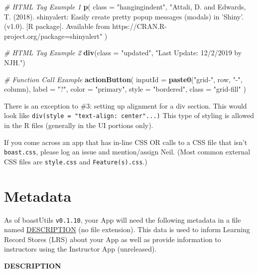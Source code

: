 \documentclass[
]{book}
\newenvironment{Shaded}{\begin{snugshade}}{\end{snugshade}}
\newcommand{\CommentTok}[1]{\textcolor[rgb]{0.56,0.35,0.01}{\textit{#1}}}
\newcommand{\DataTypeTok}[1]{\textcolor[rgb]{0.13,0.29,0.53}{#1}}
\newcommand{\KeywordTok}[1]{\textcolor[rgb]{0.13,0.29,0.53}{\textbf{#1}}}
\newcommand{\NormalTok}[1]{#1}
\newcommand{\StringTok}[1]{\textcolor[rgb]{0.31,0.60,0.02}{#1}}
\begin{document}
\begin{Shaded}
\begin{Highlighting}[]
\CommentTok{# HTML Tag Example 1}
\KeywordTok{p}\NormalTok{(}
  \DataTypeTok{class =} \StringTok{"hangingindent"}\NormalTok{,}
  \StringTok{"Attali, D. and Edwards, T. (2018). shinyalert: Easily create}
\StringTok{  pretty popup messages (modals) in 'Shiny'. (v1.0). [R package].}
\StringTok{  Available from https://CRAN.R-project.org/package=shinyalert"}
\NormalTok{)}

\CommentTok{# HTML Tag Example 2}
\KeywordTok{div}\NormalTok{(}\DataTypeTok{class =} \StringTok{"updated"}\NormalTok{, }\StringTok{"Last Update: 12/2/2019 by NJH."}\NormalTok{)}

\CommentTok{# Function Call Example}
\KeywordTok{actionButton}\NormalTok{(}
  \DataTypeTok{inputId =} \KeywordTok{paste0}\NormalTok{(}\StringTok{"grid-"}\NormalTok{, row, }\StringTok{"-"}\NormalTok{, column),}
  \DataTypeTok{label =} \StringTok{"?"}\NormalTok{,}
  \DataTypeTok{color =} \StringTok{"primary"}\NormalTok{,}
  \DataTypeTok{style =} \StringTok{"bordered"}\NormalTok{,}
  \DataTypeTok{class =} \StringTok{"grid-fill"}
\NormalTok{)}
\end{Highlighting}
\end{Shaded}

There is an exception to \#3: setting up alignment for a div section. This would look like \texttt{div(style\ =\ "text-align:\ center"...)} This type of styling is allowed in the R files (generally in the UI portions only).

If you come across an app that has in-line CSS OR calls to a CSS file that isn't \texttt{boast.css}, please log an issue and mention/assign Neil. (Most common external CSS files are \texttt{style.css} and \texttt{Feature(s).css}.)

\hypertarget{metadatab}{%
\section{Metadata}\label{metadatab}}

As of boastUtils \texttt{v0.1.10}, your App will need the following metadata in a file named \href{https://github.com/EducationShinyAppTeam/App_Template/blob/master/DESCRIPTION}{DESCRIPTION} (no file extension). This data is used to inform Learning Record Stores (LRS) about your App as well as provide information to instructors using the Instructor App (unreleased).

\textbf{DESCRIPTION}
\end{document}

